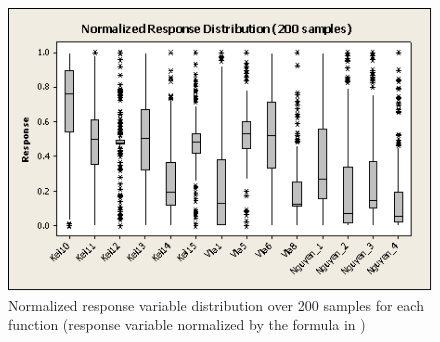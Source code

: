 \begin{figure}
\centering
\includegraphics[scale=0.6]{Figures/Figure3.png}
\caption{Normalized response variable distribution over 200 samples for each function (response variable normalized by the formula in \cite{2015Mig})}
\label{fig:Distribute}       %
\end{figure}
